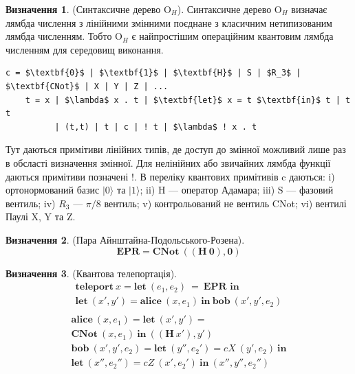 \documentclass{article}
\theoremstyle{definition}
\newtheorem{definition}{Визначення}
\begin{document}
\newpage
\begin{definition} (Синтаксичне дерево O$_H$).
Синтаксичне дерево O$_H$ визначає лямбда числення з лінійними змінними
поєднане з класичним нетипизованим лямбда численням. Тобто O$_H$ є
найпростішим операційним квантовим лямбда численням для середовищ виконання.
\begin{lstlisting}[mathescape=true]
    c = $\textbf{0}$ | $\textbf{1}$ | $\textbf{H}$ | S | $R_3$ | $\textbf{CNot}$ | X | Y | Z | ...
    t = x | $\lambda$ x . t | $\textbf{let}$ x = t $\textbf{in}$ t | t t
          | (t,t) | t | c | ! t | $\lambda$ ! x . t
\end{lstlisting}
Тут даються примітиви лінійних типів, де доступ до змінної
можливий лише раз в обсласті визначення змінної. Для нелінійних або звичайних
лямбда функції даються примітиви позначені !. В переліку квантових примітивів
c даються:
i) ортонормований базис $|0\rangle$ та $|1\rangle$;
ii) H --- оператор Адамара;
iii) S --- фазовий вентиль;
iv) $R_3$ --- $\pi/8$ вентиль;
v) контрольований не вентиль CNot;
vi) вентилі Паулі X, Y та Z.
\end{definition}

\begin{definition} (Пара Айнштайна-Подольського-Розена).
\begin{equation}
\textbf{EPR} = \textbf{CNot}\ ((\textbf{H}\ \textbf{0}),\textbf{0})
\end{equation}
\end{definition}

\begin{definition} (Квантова телепортація).
\begin{multline}
\textbf{teleport}\ x = \textbf{let}\ (e_1,e_2)\ =\ \textbf{EPR in} \\
\textbf{let}\ (x',y') = \textbf{alice}\ (x,e_1)\ \textbf{in}\ \textbf{bob}\ (x',y',e_2) \\
\end{multline}
\begin{multline}
\textbf{alice}\ (x,e_1) = \textbf{let}\ (x',y') = \\
\textbf{CNot}\ (x,e_1)\ \textbf{in}\ ((\textbf{H}\ x'),y') \\
\textbf{bob}\ (x',y',e_2) = \textbf{let}\ (y'',e_2') = cX\ (y',e_2)\ \textbf{in} \\
\textbf{let}\ (x'',e_2'') = cZ\ (x',e_2')\ \textbf{in}\ (x'',y'',e_2'')
\end{multline}
\end{definition}
\end{document}

